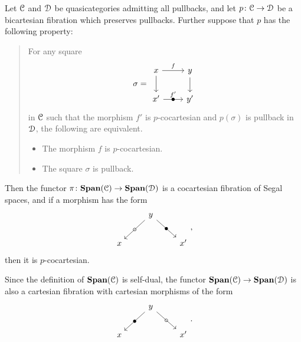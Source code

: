 \documentclass[main.tex]{subfiles}
\begin{document}
\begin{theorem}
  \label{thm:span_of_bicartesian_fibration_is_bicartesian_fibration}
  Let $\mathcal{C}$ and $\mathcal{D}$ be quasicategories admitting all pullbacks, and let $p\colon \mathcal{C} \to \mathcal{D}$ be a bicartesian fibration which preserves pullbacks. Further suppose that $p$ has the following property:

  \begin{quote}
    For any square
    \begin{equation*}
      \sigma =
      \begin{tikzcd}
        x
        \arrow[r, "f"]
        \arrow[d]
        & y
        \arrow[d]
        \\
        x'
        \arrow[r, "f'", "\bullet" marking]
        & y'
      \end{tikzcd}
    \end{equation*}
    in $\mathcal{C}$ such that the morphism $f'$ is $p$-cocartesian and $p(\sigma)$ is pullback in $\mathcal{D}$, the following are equivalent.
    \begin{itemize}
      \item The morphism $f$ is $p$-cocartesian.

      \item The square $\sigma$ is pullback.
    \end{itemize}
  \end{quote}

  Then the functor $\pi\colon \mathbf{Span}(\mathcal{C}) \to \mathbf{Span}(\mathcal{D})$ is a cocartesian fibration of Segal spaces, and if a morphism has the form
  \begin{equation*}
    \begin{tikzcd}
      & y
      \arrow[dl, "\circ" marking]
      \arrow[dr, "\bullet" marking]
      \\
      x
      && x'
    \end{tikzcd},
  \end{equation*}
  then it is $p$-cocartesian.
\end{theorem}

\begin{note}
  Since the definition of $\mathbf{Span}(\mathcal{C})$ is self-dual, the functor $\mathbf{Span}(\mathcal{C}) \to \mathbf{Span}(\mathcal{D})$ is also a cartesian fibration with cartesian morphisms of the form
  \begin{equation*}
    \begin{tikzcd}
      & y
      \arrow[dl, "\bullet" marking]
      \arrow[dr, "\circ" marking]
      \\
      x
      && x'
    \end{tikzcd}.
  \end{equation*}
\end{note}
\end{document}
